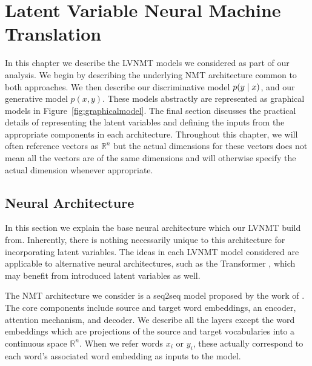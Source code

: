\chapter{Latent Variable Neural Machine Translation}

In this chapter we describe the \ac{LVNMT} models we considered as part of our analysis. We begin by describing the underlying \ac{NMT} architecture common to both approaches. We then describe our discriminative model $p(y \; | \;{x})$, and our generative model $p(x, y)$. These models abstractly are represented as graphical models in Figure~\ref{fig:graphicalmodel}. The final section discusses the practical details of representing the latent variables and defining the inputs from the appropriate components in each architecture. Throughout this chapter, we will often reference vectors as $\mathbb{R}^{n}$ but the actual dimensions for these vectors does not mean all the vectors are of the same dimensions and will otherwise specify the actual dimension whenever appropriate. 


\section{Neural Architecture}

In this section we explain the base neural architecture which our \ac{LVNMT} build from. Inherently, there is nothing necessarily unique to this architecture for incorporating latent variables.  The ideas in each \ac{LVNMT} model considered are applicable to alternative neural architectures, such as the Transformer \cite{vaswani2017attentionTransformer}, which may benefit from introduced latent variables as well. 

The \ac{NMT} architecture we consider is a \ac{seq2seq} model proposed by the work of  \citet{bahdanau2014NMTBYJoint}. The core components include source and target word embeddings, an encoder, attention mechanism, and decoder. We describe all the layers except the word embeddings which are projections of the source and target vocabularies into a continuous space $\mathbb{R}^{n}$. When we refer words $x_{i}$ or $y_{i}$, these actually correspond to each word's associated word embedding as inputs to the model.  

